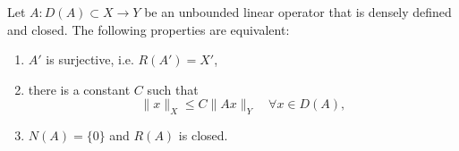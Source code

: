 \begin{theorem}
Let $A: D(A)\subset X\to Y$ be an unbounded linear operator that is densely defined and closed. The following properties are equivalent:
\begin{enumerate}[label=(\alph*)]
\item $A'$ is surjective, i.e. $R(A')=X'$,
\item there is a constant $C$ such that
\[
\|x\|_{X}\leq C\|Ax\|_{Y}\quad \forall x\in D(A),
\]
\item $N(A)=\{0\}$ and $R(A)$ is closed.
\end{enumerate}
\end{theorem}








